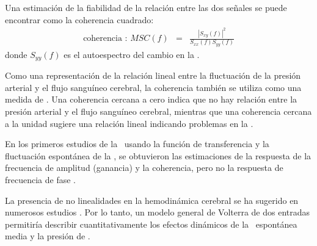Una estimación de la fiabilidad de la relación entre las dos señales se puede encontrar como la coherencia cuadrado:
\begin{eqnarray}
    \mbox{coherencia : } MSC(f) &=& \frac{|S_{xy}(f)|^2}{S_{xx}(f)S_{yy}(f)}
\end{eqnarray}
donde $S_{yy}(f)$ es el autoespectro del cambio en la \cbfv.



Como una representación de la relación lineal entre la fluctuación de la presión arterial y el flujo sanguíneo cerebral, la coherencia también se utiliza como una medida de \ca. Una coherencia cercana a cero indica que no hay relación entre la presión arterial y el flujo sanguíneo cerebral, mientras que una coherencia cercana a la unidad sugiere una relación lineal indicando problemas en la \ca.

En los primeros estudios de la \ca\, usando la función de transferencia y la fluctuación espontánea de la \bp, se obtuvieron las estimaciones de la respuesta de la frecuencia de amplitud (ganancia) y la coherencia, pero no la respuesta de frecuencia de fase \citep{Giller1990}.


La presencia de no linealidades en la hemodinámica cerebral se ha sugerido en numerosos estudios \citep{Mitsis2002, Zhang1998, Mitsis2004a, Giller2003}. Por lo tanto, un modelo general de Volterra de dos entradas permitiría describir cuantitativamente los efectos dinámicos de la \abp\, espontánea media y la presión de \etcoo.



